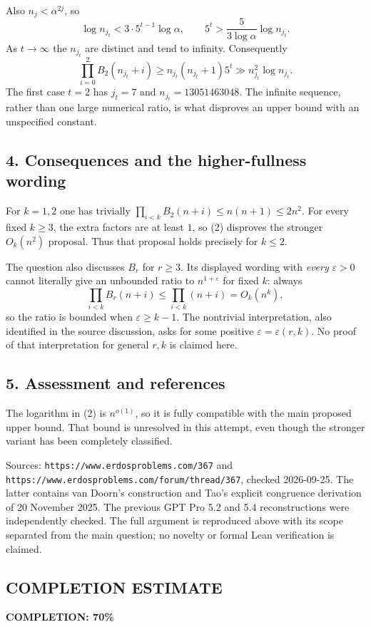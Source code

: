 Also $n_j<\alpha^{2j}$, so
\[
 \log n_{j_t}<3\cdot5^{t-1}\log\alpha,\qquad
 5^t>\frac5{3\log\alpha}\log n_{j_t}.
\]
As $t\to\infty$ the $n_{j_t}$ are distinct and tend to infinity.
Consequently
\[
 \prod_{i=0}^2B_2(n_{j_t}+i)
 \ge n_{j_t}(n_{j_t}+1)5^t
 \gg n_{j_t}^2\log n_{j_t}.                       \tag{2}
\]
The first case $t=2$ has $j_t=7$ and $n_{j_t}=13051463048$.
The infinite sequence, rather than one large numerical ratio,
is what disproves an upper bound with an unspecified constant.

\subsection*{4. Consequences and the higher-fullness wording}
For $k=1,2$ one has trivially
$\prod_{i<k}B_2(n+i)\le n(n+1)\le2n^2$.
For every fixed $k\ge3$, the extra factors are at least $1$,
so (2) disproves the stronger $O_k(n^2)$ proposal.
Thus that proposal holds precisely for $k\le2$.

The question also discusses $B_r$ for $r\ge3$. Its displayed wording
with \emph{every} $\varepsilon>0$ cannot literally give an unbounded
ratio to $n^{1+\varepsilon}$ for fixed $k$: always
\[
 \prod_{i<k}B_r(n+i)\le\prod_{i<k}(n+i)=O_k(n^k),
\]
so the ratio is bounded when $\varepsilon\ge k-1$.
The nontrivial interpretation, also identified in the source discussion,
asks for some positive $\varepsilon=\varepsilon(r,k)$.
No proof of that interpretation for general $r,k$ is claimed here.

\subsection*{5. Assessment and references}
The logarithm in (2) is $n^{o(1)}$, so it is fully compatible with
the main proposed upper bound. That bound is unresolved in this
attempt, even though the stronger variant has been completely
classified.

Sources: \texttt{https://www.erdosproblems.com/367} and
\texttt{https://www.erdosproblems.com/forum/thread/367}, checked
2026-09-25. The latter contains van Doorn's construction and
Tao's explicit congruence derivation of 20 November 2025.
The previous GPT Pro 5.2 and 5.4 reconstructions were independently
checked. The full argument is reproduced above with its scope
separated from the main question; no novelty or formal Lean
verification is claimed.
\subsection*{COMPLETION ESTIMATE}
\textbf{COMPLETION: 70\%}
